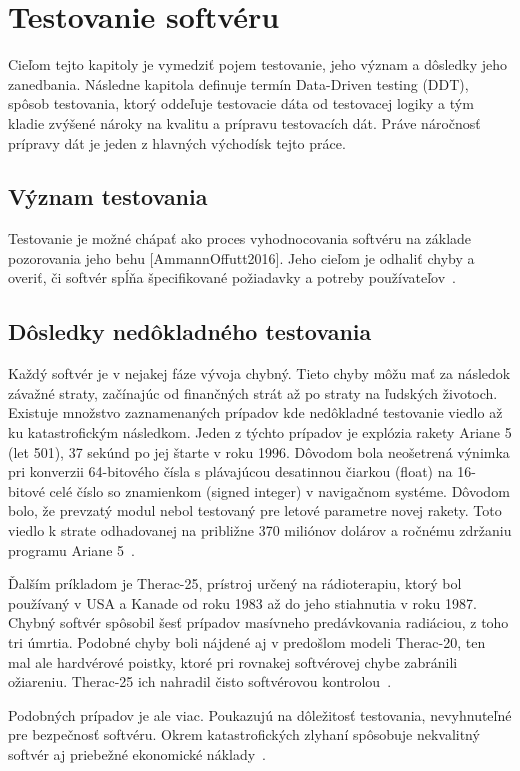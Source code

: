 \chapter{Testovanie softvéru}
\label{ch:kap2}
Cieľom tejto kapitoly je vymedziť pojem testovanie, jeho význam a dôsledky jeho zanedbania. Následne kapitola definuje termín Data-Driven testing (DDT), spôsob testovania, ktorý oddeľuje testovacie dáta od testovacej logiky a tým kladie zvýšené nároky na kvalitu a prípravu testovacích dát. Práve náročnosť prípravy dát je jeden z hlavných východísk tejto práce.

\section{Význam testovania}
Testovanie je možné chápať ako proces vyhodnocovania softvéru na základe pozorovania jeho behu [AmmannOffutt2016]. Jeho cieľom je odhaliť chyby a overiť, či softvér spĺňa špecifikované požiadavky a potreby používateľov~\cite{Myers2011}.

\section{Dôsledky nedôkladného testovania}
Každý softvér je v nejakej fáze vývoja chybný. Tieto chyby môžu mať za následok závažné straty, začínajúc od finančných strát až po straty na ľudských životoch. Existuje množstvo zaznamenaných prípadov kde nedôkladné testovanie viedlo až ku katastrofickým následkom. Jeden z týchto prípadov je explózia rakety  Ariane 5 (let 501), 37 sekúnd po jej štarte v roku 1996. Dôvodom bola neošetrená výnimka pri konverzii 64-bitového čísla s plávajúcou desatinnou čiarkou (float) na 16-bitové celé číslo so znamienkom (signed integer) v navigačnom systéme. Dôvodom bolo, že prevzatý modul nebol testovaný pre letové parametre novej rakety. Toto viedlo k strate odhadovanej na približne 370 miliónov dolárov a ročnému zdržaniu programu Ariane 5~\cite{lions1996}.

Ďalším príkladom je Therac-25, prístroj určený na rádioterapiu, ktorý bol používaný v USA a Kanade od roku 1983 až do jeho stiahnutia v roku 1987. Chybný softvér spôsobil šesť prípadov masívneho predávkovania radiáciou, z toho tri úmrtia. Podobné chyby boli nájdené aj v predošlom modeli Therac-20, ten mal ale hardvérové poistky, ktoré pri rovnakej softvérovej chybe zabránili ožiareniu. Therac-25 ich nahradil čisto softvérovou kontrolou~\cite{Leveson1993}.

Podobných prípadov je ale viac. Poukazujú na dôležitosť testovania, nevyhnuteľné pre bezpečnosť softvéru. Okrem katastrofických zlyhaní spôsobuje nekvalitný softvér aj priebežné ekonomické náklady~\cite{krasner2022}.


